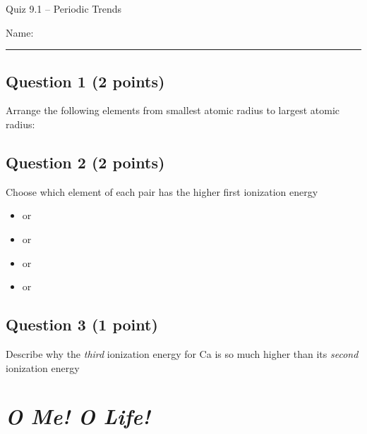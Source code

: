 \documentclass[11pt, letterpaper]{memoir}
\begin{document}
	\begin{center}
		{\large	Quiz 9.1 -- Periodic Trends}
	\end{center}
{\large Name: \rule[-1mm]{4in}{.1pt}
	
	\subsection*{Question 1 (2 points)}
	Arrange the following elements from smallest atomic radius to largest atomic radius:
	
	 \hspace{2em}  \hspace{2em}  \hspace{2em}  \hspace{2em}  \hspace{2em} 
	
	\vspace{8em}
	\subsection*{Question 2 (2 points)}
	Choose which element of each pair has the higher first ionization energy
	
	\begin{itemize}
		\item {} or 
		\item \vspace{0.5em} or 
		\item \vspace{0.5em} or 
		\item \vspace{0.5em} or 
	\end{itemize}
	
	\vspace{0.25em}
	\subsection*{Question 3 (1 point)}
	Describe why the \emph{third} ionization energy for Ca is so much higher than its \emph{second} ionization energy
\newpage
\pagestyle{empty}
\addtocounter{page}{-1}
\section*{\emph{O Me! O Life!}}
}
\end{document}

